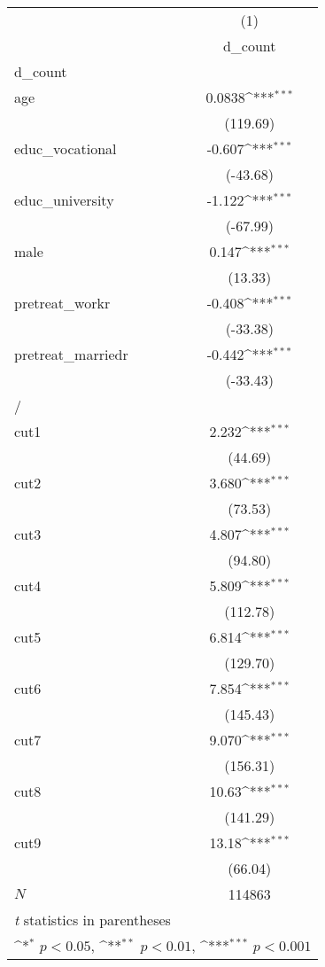 {
\def\sym#1{\ifmmode^{#1}\else\(^{#1}\)\fi}
\begin{tabular}{l*{1}{c}}
\hline\hline
            &\multicolumn{1}{c}{(1)}\\
            &\multicolumn{1}{c}{d\_count}\\
\hline
d\_count     &                     \\
age         &      0.0838\sym{***}\\
            &    (119.69)         \\
[1em]
educ\_vocational&      -0.607\sym{***}\\
            &    (-43.68)         \\
[1em]
educ\_university&      -1.122\sym{***}\\
            &    (-67.99)         \\
[1em]
male        &       0.147\sym{***}\\
            &     (13.33)         \\
[1em]
pretreat\_workr&      -0.408\sym{***}\\
            &    (-33.38)         \\
[1em]
pretreat\_marriedr&      -0.442\sym{***}\\
            &    (-33.43)         \\
\hline
/           &                     \\
cut1        &       2.232\sym{***}\\
            &     (44.69)         \\
[1em]
cut2        &       3.680\sym{***}\\
            &     (73.53)         \\
[1em]
cut3        &       4.807\sym{***}\\
            &     (94.80)         \\
[1em]
cut4        &       5.809\sym{***}\\
            &    (112.78)         \\
[1em]
cut5        &       6.814\sym{***}\\
            &    (129.70)         \\
[1em]
cut6        &       7.854\sym{***}\\
            &    (145.43)         \\
[1em]
cut7        &       9.070\sym{***}\\
            &    (156.31)         \\
[1em]
cut8        &       10.63\sym{***}\\
            &    (141.29)         \\
[1em]
cut9        &       13.18\sym{***}\\
            &     (66.04)         \\
\hline
\(N\)       &      114863         \\
\hline\hline
\multicolumn{2}{l}{\footnotesize \textit{t} statistics in parentheses}\\
\multicolumn{2}{l}{\footnotesize \sym{*} \(p<0.05\), \sym{**} \(p<0.01\), \sym{***} \(p<0.001\)}\\
\end{tabular}
}
